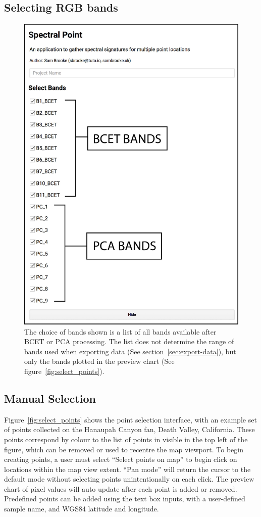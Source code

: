\documentclass[12pt]{article}
\begin{document}
\subsection{Selecting RGB bands}

\begin{figure}[htbp]
\centering
\includegraphics[width=.5\textwidth]{images/choose_bands_reduced.jpg}
\caption{The choice of bands shown is a list of all bands available after BCET or PCA processing. The list does not determine the range of bands used when exporting data (See section~\ref{sec:export-data}), but only the bands plotted in the preview chart (See figure~\ref{fig:select_points}).}
\label{fig:choose_bands}
\end{figure}

\subsection{Manual Selection}

Figure~\ref{fig:select_points} shows the point selection interface, with an example set of points collected on the Hanaupah Canyon fan, Death Valley, California. These points correspond by colour to the list of points in visible in the top left of the figure, which can be removed or used to recentre the map viewport. To begin creating points, a user must select ``Select points on map'' to begin click on locations within the map view extent. ``Pan mode'' will return the cursor to the default mode without selecting points unintentionally on each click. The preview chart of pixel values will auto update after each point is added or removed. Predefined points can be added using the text box inputs, with a user-defined sample name, and WGS84 latitude and longitude.
\end{document}
